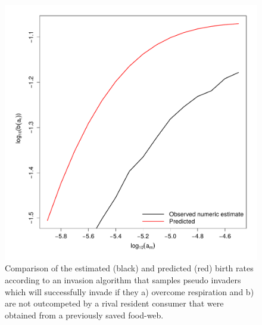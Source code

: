 \documentclass[a4paper]{report}
\begin{document}
{%
\begin{figure}[H]
\caption{Comparison of the estimated (black) and predicted (red) birth rates  according to an invasion algorithm that samples pseudo invaders which will successfully invade if they a) overcome respiration and b) are not outcompeted by a rival resident consumer that were obtained from a previously saved food-web. \label{fig:birth_rate_comp}}
\centering{}
\includegraphics[scale=0.6]{../Images/Birth_rate_comp.pdf}
\end{figure}


}
\end{document}
